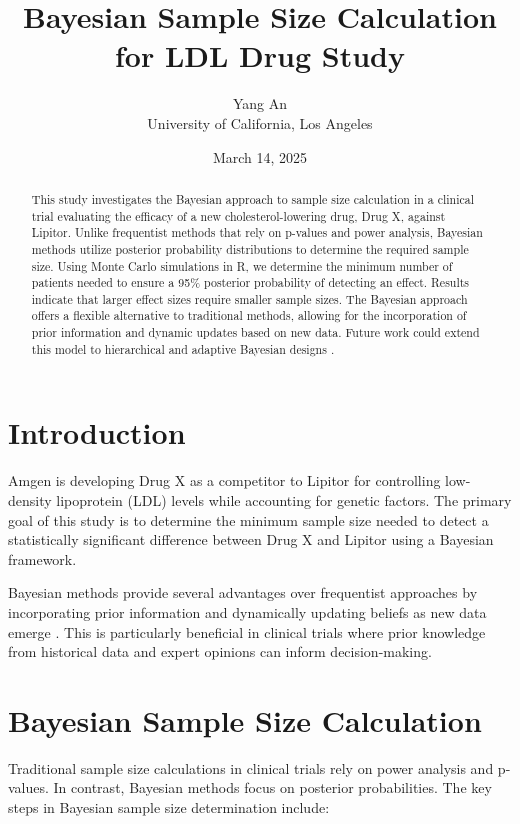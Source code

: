 \documentclass{article}
\title{Bayesian Sample Size Calculation for LDL Drug Study}
\author{Yang An \\ University of California, Los Angeles}
\date{March 14, 2025}
\begin{document}
	
	\maketitle
	
	\begin{abstract}
		This study investigates the Bayesian approach to sample size calculation in a clinical trial evaluating the efficacy of a new cholesterol-lowering drug, Drug X, against Lipitor. Unlike frequentist methods that rely on p-values and power analysis, Bayesian methods utilize posterior probability distributions to determine the required sample size. Using Monte Carlo simulations in R, we determine the minimum number of patients needed to ensure a 95\% posterior probability of detecting an effect. Results indicate that larger effect sizes require smaller sample sizes. The Bayesian approach offers a flexible alternative to traditional methods, allowing for the incorporation of prior information and dynamic updates based on new data. Future work could extend this model to hierarchical and adaptive Bayesian designs \cite{Smith2023}.
	\end{abstract}
	
	\section{Introduction}
	Amgen is developing Drug X as a competitor to Lipitor for controlling low-density lipoprotein (LDL) levels while accounting for genetic factors. The primary goal of this study is to determine the minimum sample size needed to detect a statistically significant difference between Drug X and Lipitor using a Bayesian framework.
	
	Bayesian methods provide several advantages over frequentist approaches by incorporating prior information and dynamically updating beliefs as new data emerge \cite{Jones2024}. This is particularly beneficial in clinical trials where prior knowledge from historical data and expert opinions can inform decision-making.
	
	\section{Bayesian Sample Size Calculation}
	Traditional sample size calculations in clinical trials rely on power analysis and p-values. In contrast, Bayesian methods focus on posterior probabilities. The key steps in Bayesian sample size determination include:
	
\end{document}
